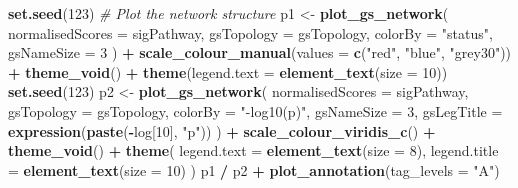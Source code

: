\documentclass[9pt,a4paper,]{extarticle}
\newenvironment{Shaded}{\begin{snugshade}}{\end{snugshade}}
\newcommand{\AttributeTok}[1]{\textcolor[rgb]{0.13,0.29,0.53}{#1}}
\newcommand{\CommentTok}[1]{\textcolor[rgb]{0.56,0.35,0.01}{\textit{#1}}}
\newcommand{\DecValTok}[1]{\textcolor[rgb]{0.00,0.00,0.81}{#1}}
\newcommand{\FunctionTok}[1]{\textcolor[rgb]{0.13,0.29,0.53}{\textbf{#1}}}
\newcommand{\NormalTok}[1]{#1}
\newcommand{\OtherTok}[1]{\textcolor[rgb]{0.56,0.35,0.01}{#1}}
\newcommand{\SpecialCharTok}[1]{\textcolor[rgb]{0.81,0.36,0.00}{\textbf{#1}}}
\newcommand{\StringTok}[1]{\textcolor[rgb]{0.31,0.60,0.02}{#1}}
\begin{document}
\begin{Shaded}
\begin{Highlighting}[]
\FunctionTok{set.seed}\NormalTok{(}\DecValTok{123}\NormalTok{)}
\CommentTok{\# Plot the network structure}
\NormalTok{p1 }\OtherTok{\textless{}{-}} \FunctionTok{plot\_gs\_network}\NormalTok{(}
  \AttributeTok{normalisedScores =}\NormalTok{ sigPathway, }\AttributeTok{gsTopology =}\NormalTok{ gsTopology, }\AttributeTok{colorBy =} \StringTok{"status"}\NormalTok{,}
  \AttributeTok{gsNameSize =} \DecValTok{3}
\NormalTok{) }\SpecialCharTok{+}
  \FunctionTok{scale\_colour\_manual}\NormalTok{(}\AttributeTok{values =} \FunctionTok{c}\NormalTok{(}\StringTok{"red"}\NormalTok{, }\StringTok{"blue"}\NormalTok{, }\StringTok{"grey30"}\NormalTok{)) }\SpecialCharTok{+}
  \FunctionTok{theme\_void}\NormalTok{() }\SpecialCharTok{+}
  \FunctionTok{theme}\NormalTok{(}\AttributeTok{legend.text =} \FunctionTok{element\_text}\NormalTok{(}\AttributeTok{size =} \DecValTok{10}\NormalTok{)) }
\FunctionTok{set.seed}\NormalTok{(}\DecValTok{123}\NormalTok{)}
\NormalTok{p2 }\OtherTok{\textless{}{-}} \FunctionTok{plot\_gs\_network}\NormalTok{(}
  \AttributeTok{normalisedScores =}\NormalTok{ sigPathway,}
  \AttributeTok{gsTopology =}\NormalTok{ gsTopology, }
  \AttributeTok{colorBy  =} \StringTok{"{-}log10(p)"}\NormalTok{, }
  \AttributeTok{gsNameSize =} \DecValTok{3}\NormalTok{,}
  \AttributeTok{gsLegTitle =} \FunctionTok{expression}\NormalTok{(}\FunctionTok{paste}\NormalTok{(}\SpecialCharTok{{-}}\NormalTok{log[}\DecValTok{10}\NormalTok{], }\StringTok{"p"}\NormalTok{))}
\NormalTok{) }\SpecialCharTok{+}
  \FunctionTok{scale\_colour\_viridis\_c}\NormalTok{() }\SpecialCharTok{+}
  \FunctionTok{theme\_void}\NormalTok{() }\SpecialCharTok{+}
  \FunctionTok{theme}\NormalTok{(}
    \AttributeTok{legend.text =} \FunctionTok{element\_text}\NormalTok{(}\AttributeTok{size =} \DecValTok{8}\NormalTok{),}
    \AttributeTok{legend.title =} \FunctionTok{element\_text}\NormalTok{(}\AttributeTok{size =} \DecValTok{10}\NormalTok{)}
\NormalTok{  ) }
\NormalTok{p1 }\SpecialCharTok{/}\NormalTok{ p2 }\SpecialCharTok{+} \FunctionTok{plot\_annotation}\NormalTok{(}\AttributeTok{tag\_levels =} \StringTok{"A"}\NormalTok{) }
\end{Highlighting}
\end{Shaded}
\end{document}
